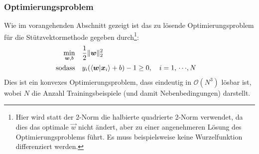 			\subsubsection{Optimierungsproblem} %
				Wie im vorangehenden Abschnitt gezeigt ist das zu lösende Optimierungsproblem für die Stützvektormethode gegeben durch\footnote{Hier wird statt der \num{2}-Norm die halbierte quadrierte \num{2}-Norm verwendet, da dies das optimale \(\vec{w}\) nicht ändert, aber zu einer angenehmeren Lösung des Optimierungsproblems führt. Es muss beispielsweise keine Wurzelfunktion differenziert werden.}:
				\begin{align}
					\min_{\bm{w}, b} \quad& \frac{1}{2} \lVert \bm{w} \rVert_2^2 \\
					\text{sodass} \quad&
						\begin{aligned}
							y_i (\braket{\bm{w}}{\bm{x}_i} + b) - 1 &\geq 0, \quad i = 1,\,\cdots\!,N
						\end{aligned}
				\end{align}
				Dies ist ein konvexes Optimierungsproblem, dass eindeutig in \( \mathcal{O}(N^3) \) lösbar ist, wobei \(N\) die Anzahl Trainingsbeispiele (und damit Nebenbedingungen) darstellt.

